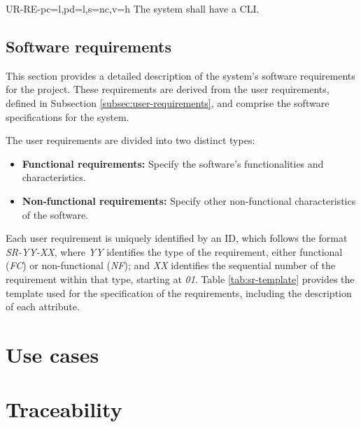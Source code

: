 \begin{userReq}{UR-RE-}{pc=l,pd=l,s=nc,v=h}
  The system shall have a \gls{CLI}.
\end{userReq}


\FloatBarrier  %


\subsection{Software requirements}\label{subsec:soft-requirements}
This section provides a detailed description of the system's software requirements for the project. These requirements are derived from the user requirements, defined in Subsection \ref{subsec:user-requirements}, and comprise the software specifications for the system.

The user requirements are divided into two distinct types:
\begin{itemize}
  \item \textbf{Functional requirements:} Specify the software's functionalities and characteristics.
  \item \textbf{Non-functional requirements:} Specify other non-functional characteristics of the software.
\end{itemize}

Each user requirement is uniquely identified by an ID, which follows the format \textit{SR-YY-XX}, where \textit{YY} identifies the type of the requirement, either functional (\textit{FC}) or non-functional (\textit{NF}); and \textit{XX} identifies the sequential number of the requirement within that type, starting at \textit{01}. Table \ref{tab:sr-template} provides the template used for the specification of the requirements, including the description of each attribute.



\setcounter{i}{1}


\setcounter{i}{1}


\FloatBarrier

\section{Use cases}\label{sec:use-cases}



\FloatBarrier



\section{Traceability}\label{sec:req-traceability}